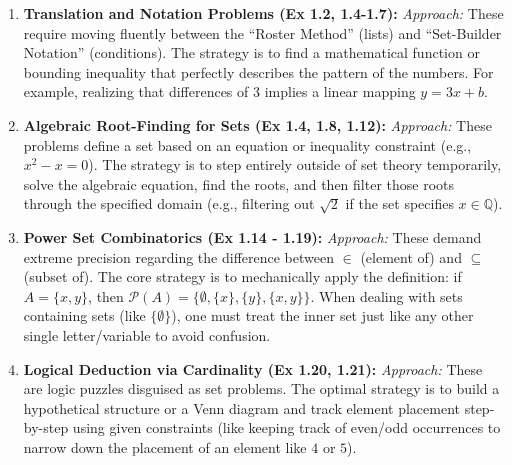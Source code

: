 \documentclass[12pt]{article}
\begin{document}
\begin{enumerate}
    \item \textbf{Translation and Notation Problems (Ex 1.2, 1.4-1.7):} 
    \textit{Approach:} These require moving fluently between the ``Roster Method'' (lists) and ``Set-Builder Notation'' (conditions). The strategy is to find a mathematical function or bounding inequality that perfectly describes the pattern of the numbers. For example, realizing that differences of $3$ implies a linear mapping $y = 3x + b$.

    \item \textbf{Algebraic Root-Finding for Sets (Ex 1.4, 1.8, 1.12):}
    \textit{Approach:} These problems define a set based on an equation or inequality constraint (e.g., $x^2 - x = 0$). The strategy is to step entirely outside of set theory temporarily, solve the algebraic equation, find the roots, and then filter those roots through the specified domain (e.g., filtering out $\sqrt{2}$ if the set specifies $x \in \mathbb{Q}$).

    \item \textbf{Power Set Combinatorics (Ex 1.14 - 1.19):}
    \textit{Approach:} These demand extreme precision regarding the difference between $\in$ (element of) and $\subseteq$ (subset of). The core strategy is to mechanically apply the definition: if $A = \{x, y\}$, then $\mathcal{P}(A) = \{\emptyset, \{x\}, \{y\}, \{x,y\}\}$. When dealing with sets containing sets (like $\{\emptyset\}$), one must treat the inner set just like any other single letter/variable to avoid confusion.

    \item \textbf{Logical Deduction via Cardinality (Ex 1.20, 1.21):}
    \textit{Approach:} These are logic puzzles disguised as set problems. The optimal strategy is to build a hypothetical structure or a Venn diagram and track element placement step-by-step using given constraints (like keeping track of even/odd occurrences to narrow down the placement of an element like $4$ or $5$).
\end{enumerate}
\end{document}
